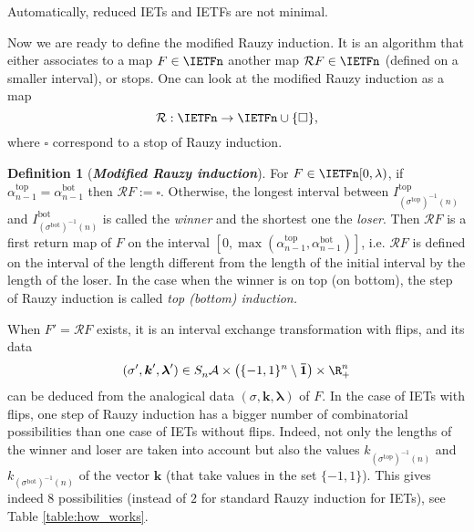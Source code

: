 \documentclass[12pt]{article}
\newcommand{\one}{\boldsymbol{\bar{1}}}
\theoremstyle{definition}
\newtheorem{definition}{Definition}
\begin{document}
Automatically, reduced IETs and IETFs are not minimal.
\bigskip

Now we are ready to define the modified Rauzy induction. It is an algorithm that either associates to a map $F \in \IETFn$ another map $\mathcal{R} F \in \IETFn$ (defined on a smaller interval), or stops. One can look at the modified Rauzy induction as a map 
\begin{equation*}
\mathcal{R}: \IETFn \rightarrow \IETFn \cup \{\square\},
\end{equation*}
where $\square$ correspond to a stop of Rauzy induction. 

\begin{definition}[\emph{\textbf{Modified Rauzy induction}}]\label{def:MRI}
For $F \in \IETFn [0, \lambda)$, if $\alpha_{n-1}^{\mathrm{top}}=\alpha_{n-1}^{\mathrm{bot}}$ then $\mathcal{R} F:=\square$. Otherwise, the longest interval between
$I^{\mathrm{top}}_{(\sigma^{\mathrm{top}})^{-1}(n)}$ and $I^{\mathrm{bot}}_{(\sigma^{\mathrm{bot}})^{-1}(n)}$ is called the \emph{winner} and the shortest one the \emph{loser}. Then $\mathcal{R} F$ is a first return map of $F$ on the interval $\left[0, \max \left(\alpha_{n-1}^{\mathrm{top}},\alpha_{n-1}^{\mathrm{bot}}\right)\right]$, i.e. $\mathcal{R}F$ is defined on the interval of the length different from the length of the initial interval by the length of the loser. In the case when the winner is on top (on bottom), the step of Rauzy induction is called\emph{ top (bottom) induction.} 
\end{definition}

When $F'=\mathcal{R} F$ exists, it is an interval exchange transformation with flips, and its data 
\begin{equation*}
(\sigma', \boldsymbol{k}', \boldsymbol{\lambda}') \in S_n^{}\mathcal{A} \times \left( \{-1,1\}^n \setminus \one \right) \times \R^n_+
\end{equation*}
can be deduced from the analogical data $(\sigma, \boldsymbol{k}, \boldsymbol{\lambda})$ of $F$. In the case of IETs with flips, one step of Rauzy induction has a bigger number of combinatorial possibilities than one case of IETs without flips. Indeed, not only the lengths of the winner and loser are taken into account but also the values $k_{(\sigma^{\mathrm{top}})^{-1}(n)}$ and $k_{(\sigma^{\mathrm{bot}})^{-1}(n)}$ of the vector $\textbf{k}$ (that take values in the set $\{-1,1\}$). This gives indeed $8$ possibilities (instead of $2$ for standard Rauzy induction for IETs), see Table \ref{table:how_works}.
\end{document}
